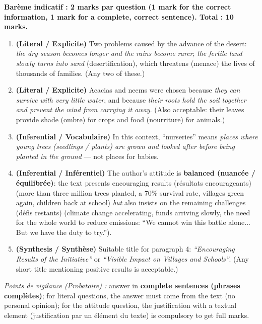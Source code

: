\documentclass[11pt]{article}
\newcommand{\cle}[1]{{\popxbold\color{popdark}#1}}
\begin{document}
\begin{corrige}
\textbf{Barème indicatif : 2 marks par question (1 mark for the correct information, 1 mark for a complete, correct sentence). Total : 10 marks.}
\begin{enumerate}
\item \textbf{(Literal / Explicite)} Two problems caused by the advance of the desert: \emph{the dry season becomes longer and the rains become rarer}; \emph{the fertile land slowly turns into sand} (desertification), which \cle{threatens (menace)} the lives of thousands of families. (Any two of these.)
\item \textbf{(Literal / Explicite)} Acacias and neems were chosen because \emph{they can survive with very little water}, and because \emph{their roots hold the soil together and prevent the wind from carrying it away}. (Also acceptable: their leaves provide \cle{shade (ombre)} for crops and \cle{food (nourriture)} for animals.)
\item \textbf{(Inferential / Vocabulaire)} In this context, ``nurseries'' means \emph{places where young trees (seedlings / plants) are grown and looked after before being planted in the ground} --- not places for babies.
\item \textbf{(Inferential / Inférentiel)} The author's attitude is \textbf{balanced (nuancée / équilibrée)}: the text presents \cle{encouraging results (résultats encourageants)} (more than three million trees planted, a 70\% survival rate, villages green again, children back at school) \emph{but} also insists on the \cle{remaining challenges (défis restants)} (climate change accelerating, funds arriving slowly, the need for the whole world to reduce emissions: ``We cannot win this battle alone... But we have the duty to try.'').
\item \textbf{(Synthesis / Synthèse)} Suitable title for paragraph 4: \emph{``Encouraging Results of the Initiative''} or \emph{``Visible Impact on Villages and Schools''}. (Any short title mentioning positive results is acceptable.)
\end{enumerate}
\emph{Points de vigilance (Probatoire) :} answer in \textbf{complete sentences (phrases complètes)}; for literal questions, the answer must come from the text (no personal opinion); for the attitude question, the \cle{justification with a textual element (justification par un élément du texte)} is compulsory to get full marks.
\end{corrige}
\end{document}
